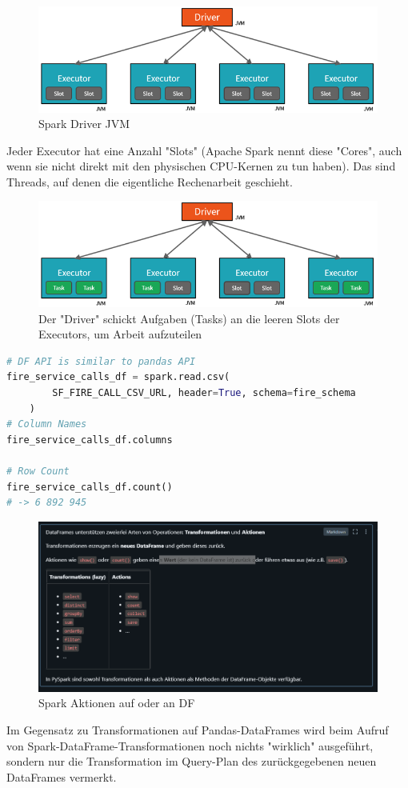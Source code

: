 \documentclass[../Main.tex]{subfiles}
\begin{document}
\begin{figure}[H]
    \centering
    \includegraphics[width=1\linewidth]{Images/spark-driver.png}
    \caption{Spark Driver JVM}
\end{figure}
Jeder Executor hat eine Anzahl "Slots" (Apache Spark nennt diese "Cores", auch wenn sie nicht direkt mit 
den physischen CPU-Kernen zu tun haben). Das sind Threads, auf denen die eigentliche Rechenarbeit geschieht.
\begin{figure}[H]
    \centering
    \includegraphics[width=1\linewidth]{Images/spark-driver-slot.png}
    \caption{Der "Driver" schickt Aufgaben (Tasks) an die leeren Slots der Executors, um Arbeit aufzuteilen}
\end{figure}

\begin{lstlisting}[language=Python]
# DF API is similar to pandas API
fire_service_calls_df = spark.read.csv(
        SF_FIRE_CALL_CSV_URL, header=True, schema=fire_schema
    )
# Column Names
fire_service_calls_df.columns

# Row Count
fire_service_calls_df.count()
# -> 6 892 945
\end{lstlisting}
\begin{figure}[H]
    \centering
    \includegraphics[width=1\linewidth]{Images/spark-df-actions.png}
    \caption{Spark Aktionen auf oder an DF}
\end{figure}
Im Gegensatz zu Transformationen auf Pandas-DataFrames wird beim Aufruf
von Spark-DataFrame-Transformationen noch nichts "wirklich" ausgeführt,
sondern nur die Transformation im Query-Plan des zurückgegebenen neuen DataFrames vermerkt.
\end{document}
